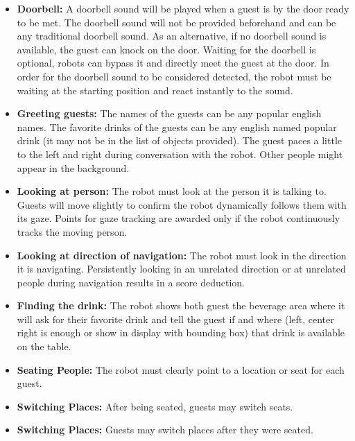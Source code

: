 \begin{itemize}

	\item \textbf{Doorbell:} A doorbell sound will be played when a guest is by the door ready to be met. The doorbell sound will not be provided beforehand and can be any traditional doorbell sound. As an alternative, if no doorbell sound is available, the guest can knock on the door. Waiting for the doorbell is optional, robots can bypass it and directly meet the guest at the door. In order for the doorbell sound to be considered detected, the robot must be waiting at the starting position and react instantly to the sound.
	
	\item \textbf{Greeting guests:} The names of the guests can be any popular english names. The favorite drinks of the guests can be any english named popular drink (it may not be in the list of objects provided).
	The guest paces a little to the left and right during conversation with the robot. Other people might appear in the background. 
	
	\item \textbf{Looking at person:} The robot must look at the person it is talking to. Guests will move slightly to confirm the robot dynamically follows them with its gaze. Points for gaze tracking are awarded only if the robot continuously tracks the moving person.
	
	\item \textbf{Looking at direction of navigation:} The robot must look in the direction it is navigating. Persistently looking in an unrelated direction or at unrelated people during navigation results in a score deduction.
    
    \item \textbf{Finding the drink:} The robot shows both guest the beverage area where it will ask for their favorite drink and tell the guest if and where (left, center right is enough or show in display with bounding box) that drink is available on the table. 
	
	\item \textbf{Seating People:} The robot must clearly point to a location or seat for each guest.

	\item \textbf{Switching Places:} After being seated, guests may switch seats.
	
	\item \textbf{Switching Places:} Guests may switch places after they were seated.
	

\end{itemize}
